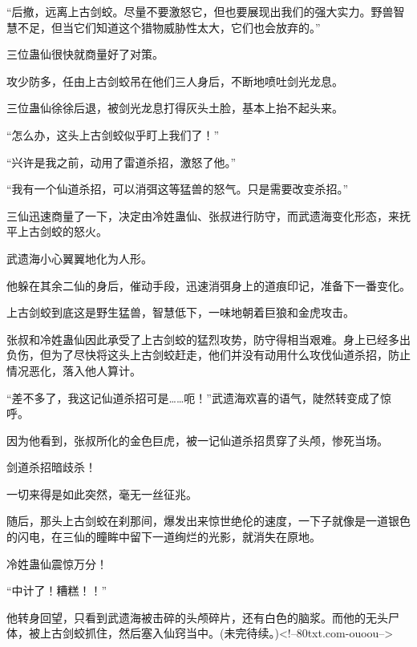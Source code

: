 \begin{this_body}
“后撤，远离上古剑蛟。尽量不要激怒它，但也要展现出我们的强大实力。野兽智慧不足，但当它们知道这个猎物威胁性太大，它们也会放弃的。”

三位蛊仙很快就商量好了对策。

攻少防多，任由上古剑蛟吊在他们三人身后，不断地喷吐剑光龙息。

三位蛊仙徐徐后退，被剑光龙息打得灰头土脸，基本上抬不起头来。

“怎么办，这头上古剑蛟似乎盯上我们了！”

“兴许是我之前，动用了雷道杀招，激怒了他。”

“我有一个仙道杀招，可以消弭这等猛兽的怒气。只是需要改变杀招。”

三仙迅速商量了一下，决定由冷姓蛊仙、张叔进行防守，而武遗海变化形态，来抚平上古剑蛟的怒火。

武遗海小心翼翼地化为人形。

他躲在其余二仙的身后，催动手段，迅速消弭身上的道痕印记，准备下一番变化。

上古剑蛟到底这是野生猛兽，智慧低下，一味地朝着巨狼和金虎攻击。

张叔和冷姓蛊仙因此承受了上古剑蛟的猛烈攻势，防守得相当艰难。身上已经多出负伤，但为了尽快将这头上古剑蛟赶走，他们并没有动用什么攻伐仙道杀招，防止情况恶化，落入他人算计。

“差不多了，我这记仙道杀招可是……呃！”武遗海欢喜的语气，陡然转变成了惊呼。

因为他看到，张叔所化的金色巨虎，被一记仙道杀招贯穿了头颅，惨死当场。

剑道杀招暗歧杀！

一切来得是如此突然，毫无一丝征兆。

随后，那头上古剑蛟在刹那间，爆发出来惊世绝伦的速度，一下子就像是一道银色的闪电，在三仙的瞳眸中留下一道绚烂的光影，就消失在原地。

冷姓蛊仙震惊万分！

“中计了！糟糕！！”

他转身回望，只看到武遗海被击碎的头颅碎片，还有白色的脑浆。而他的无头尸体，被上古剑蛟抓住，然后塞入仙窍当中。(未完待续。)<!--80txt.com-ouoou-->

\end{this_body}

